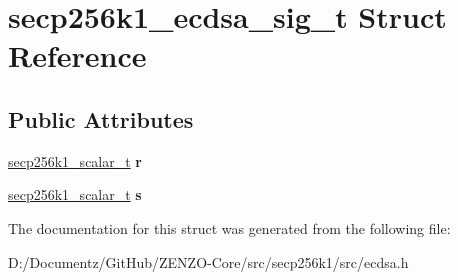 \hypertarget{structsecp256k1__ecdsa__sig__t}{}\section{secp256k1\+\_\+ecdsa\+\_\+sig\+\_\+t Struct Reference}
\label{structsecp256k1__ecdsa__sig__t}
\subsection*{Public Attributes}
\begin{DoxyCompactItemize}
\item 
\mbox{\label{structsecp256k1__ecdsa__sig__t_a32b6d48a55e5d6b28384839041050315}} 
\mbox{\hyperlink{structsecp256k1__scalar__t}{secp256k1\+\_\+scalar\+\_\+t}} {\bfseries r}
\item 
\mbox{\label{structsecp256k1__ecdsa__sig__t_a0f0890ac90c2d0438b578ee92fc9c3b6}} 
\mbox{\hyperlink{structsecp256k1__scalar__t}{secp256k1\+\_\+scalar\+\_\+t}} {\bfseries s}
\end{DoxyCompactItemize}


The documentation for this struct was generated from the following file\+:\begin{DoxyCompactItemize}
\item 
D\+:/\+Documentz/\+Git\+Hub/\+Z\+E\+N\+Z\+O-\/\+Core/src/secp256k1/src/ecdsa.\+h\end{DoxyCompactItemize}
